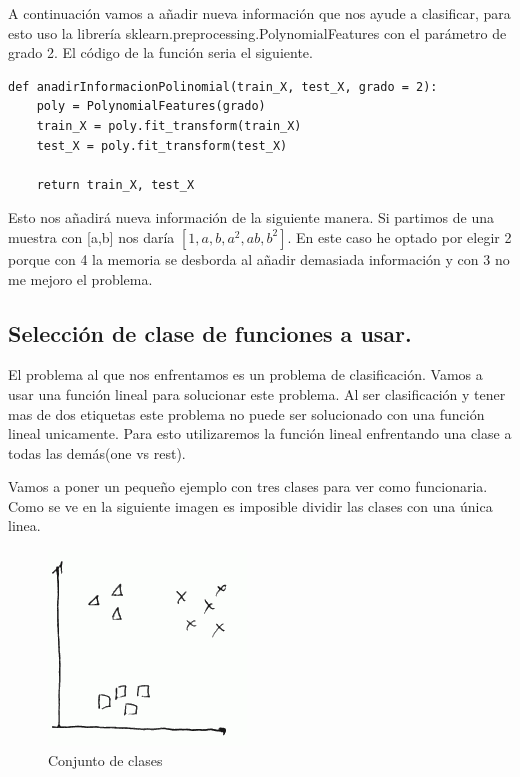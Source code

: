 \documentclass[titlepage]{article}
\begin{document}
A continuación vamos a añadir nueva información que nos ayude a clasificar, para esto uso la librería sklearn.preprocessing.PolynomialFeatures con el parámetro de grado 2. El código de la función seria el siguiente.
\begin{lstlisting}
def anadirInformacionPolinomial(train_X, test_X, grado = 2):
	poly = PolynomialFeatures(grado)
	train_X = poly.fit_transform(train_X)
	test_X = poly.fit_transform(test_X)
	
	return train_X, test_X
\end{lstlisting}

Esto nos añadirá nueva información de la siguiente manera. Si partimos de una muestra con [a,b] nos daría $[1,a,b,a^2,ab,b^2]$. En este caso he optado por elegir 2 porque con 4 la memoria se desborda al añadir demasiada información y con 3 no me mejoro el problema.

\subsection{Selección de clase de funciones a usar.}

El problema al que nos enfrentamos es un problema de clasificación. Vamos a usar una función lineal para solucionar este problema. Al ser clasificación y tener mas de dos etiquetas este problema no puede ser solucionado con una función lineal unicamente. Para esto utilizaremos la función lineal enfrentando una clase a todas las demás(one vs rest). 

Vamos a poner un pequeño ejemplo con tres clases para ver como funcionaria. Como se ve en la siguiente imagen es imposible dividir las clases con una única linea. 
\begin{figure}[H]
	\centering
	\includegraphics[width=0.7\linewidth]{screenshot002}
	\caption{Conjunto de clases}
	\label{fig:screenshot002}
\end{figure}
\end{document}
